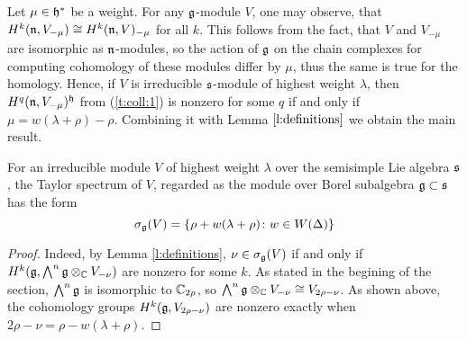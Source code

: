 Let $\mu \in \mathfrak{h}^*$ be a weight. For any $\mathfrak{g}$-module $V$, one may observe, that $H^k(\mathfrak{n},
V_{-\mu}) \cong H^k(\mathfrak{n}, V)_{-\mu}$ for all $k$. This follows from the fact, that $V$ and
$V_{-\mu}$ are isomorphic as $\mathfrak{n}$-modules, so the action of $\mathfrak{g}$ on the chain complexes for
computing cohomology of these modules differ by $\mu$, thus the same is true for the homology.
Hence, if $V$ is irreducible $\mathfrak{s}$-module of highest weight $\lambda$, then $H^q(\mathfrak{n},
V_{-\mu})^{\mathfrak{h}}$ from (\ref{t:coll:1}) is nonzero for some $q$ if and only if $\mu = w(\lambda +
\rho) - \rho$. Combining it with Lemma $\ref{l:definitions}$ we obtain the main result.
\begin{theorem} \label{t:borelspectrum}
   For an irreducible module $V$ of highest weight $\lambda$ over the semisimple Lie algebra
   $\mathfrak{s}$, the Taylor spectrum of $V$, regarded as the module over Borel subalgebra $\mathfrak{g} \subset
   \mathfrak{s}$ has the form 
   \[
       \sigma_{\mathfrak{g}}(V) = \{ \rho + w(\lambda + \rho)\colon w \in W(\Delta)\}
   \]
\end{theorem}
\begin{proof}
    Indeed, by Lemma \ref{l:definitions}, $\nu \in \sigma_{\mathfrak{g}}(V)$ if and only if $H^k(\mathfrak{g},
    \bigwedge^n\mathfrak{g} \otimes_{\mathbb{C}} V_{-\nu})$ are nonzero for some $k$. As stated in the begining of
    the section, $\bigwedge^n \mathfrak{g}$ is isomorphic to $\mathbb{C}_{2\rho}$, so $\bigwedge^n\mathfrak{g}
    \otimes_{\mathbb{C}} V_{-\nu} \cong V_{2\rho - \nu}$. As shown above, the cohomology groups $H^k(\mathfrak{g},
    V_{2\rho - \nu})$ are nonzero exactly when $2\rho - \nu = \rho - w(\lambda + \rho)$.
\end{proof}
